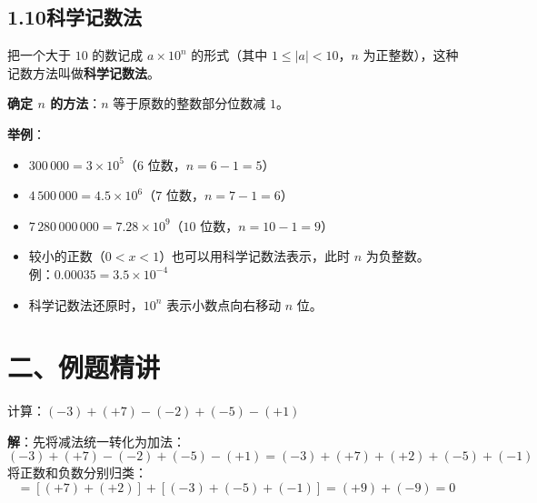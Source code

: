 \documentclass[12pt, a4paper]{ctexart}
\begin{document}
\subsection*{1.10\quad 科学记数法}

\begin{knowledgebox}[科学记数法]
把一个大于 $10$ 的数记成 $a \times 10^n$ 的形式（其中 $1 \leqslant |a| < 10$，$n$ 为正整数），这种记数方法叫做\textbf{科学记数法}。

\textbf{确定 $n$ 的方法}：$n$ 等于原数的整数部分位数减 $1$。

\textbf{举例}：
\begin{itemize}[leftmargin=*]
  \item $300\,000 = 3 \times 10^5$（$6$ 位数，$n = 6 - 1 = 5$）
  \item $4\,500\,000 = 4.5 \times 10^6$（$7$ 位数，$n = 7 - 1 = 6$）
  \item $7\,280\,000\,000 = 7.28 \times 10^9$（$10$ 位数，$n = 10 - 1 = 9$）
\end{itemize}
\end{knowledgebox}

\begin{tipbox}[科学记数法小技巧]
\begin{itemize}[leftmargin=*]
  \item 较小的正数（$0 < x < 1$）也可以用科学记数法表示，此时 $n$ 为负整数。\\
  例：$0.00035 = 3.5 \times 10^{-4}$
  \item 科学记数法还原时，$10^n$ 表示小数点向右移动 $n$ 位。
\end{itemize}
\end{tipbox}


\section*{\textcolor{examorange}{二、例题精讲}}

\begin{examplebox}[【例题1】有理数的加减混合计算]
计算：$(-3) + (+7) - (-2) + (-5) - (+1)$
\end{examplebox}

\textbf{解}：先将减法统一转化为加法：
\[
(-3) + (+7) - (-2) + (-5) - (+1) = (-3) + (+7) + (+2) + (-5) + (-1)
\]
将正数和负数分别归类：
\[
= [(+7) + (+2)] + [(-3) + (-5) + (-1)] = (+9) + (-9) = 0
\]
\end{document}
